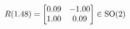 \documentclass[preview]{standalone}
\begin{document}
\begin{align*}
\special{dvisvgm:raw <g id='unique000'>}R(1.48) = \begin{bmatrix} 0.09 & -1.00 \\ 1.00 & 0.09 \end{bmatrix} \in \text{SO}(2)\special{dvisvgm:raw </g>}
\end{align*}
\end{document}
